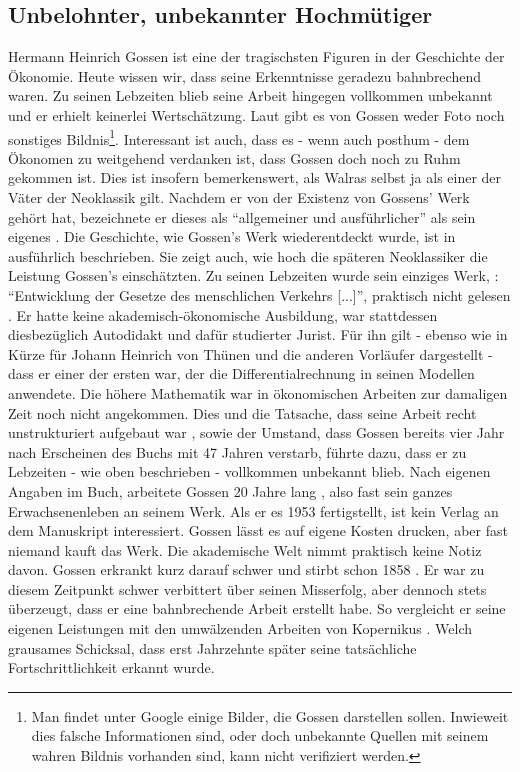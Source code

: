 \subsection{Unbelohnter, unbekannter Hochmütiger}

Hermann Heinrich Gossen ist eine der tragischsten Figuren in der Geschichte der Ökonomie. Heute wissen wir, dass seine Erkenntnisse geradezu bahnbrechend waren. Zu seinen Lebzeiten blieb seine Arbeit hingegen vollkommen unbekannt und er erhielt keinerlei Wertschätzung. Laut \textcite{Kurz2009} gibt es von Gossen weder Foto noch sonstiges Bildnis\footnote{Man findet unter Google einige Bilder, die Gossen darstellen sollen. Inwieweit dies falsche Informationen sind, oder doch unbekannte Quellen mit seinem wahren Bildnis vorhanden sind, kann nicht verifiziert werden.}. Interessant ist auch, dass es - wenn auch posthum - dem Ökonomen \textcite{Walras1885} zu weitgehend verdanken ist, dass Gossen doch noch zu Ruhm gekommen ist. Dies ist insofern bemerkenswert, als Walras selbst ja als einer der Väter der Neoklassik gilt. Nachdem er von der Existenz von Gossens' Werk gehört hat, bezeichnete er dieses als "`allgemeiner und ausführlicher"' als sein eigenes \parencite[S. 1]{Kurz2009}. Die Geschichte, wie Gossen's Werk wiederentdeckt wurde, ist in \textcite{Ikeda2000} ausführlich beschrieben. Sie zeigt auch, wie hoch die späteren Neoklassiker die Leistung Gossen's einschätzten.
Zu seinen Lebzeiten wurde sein einziges Werk, \textcite{Gossen1854}: "`Entwicklung der Gesetze des menschlichen Verkehrs [...]"', praktisch nicht gelesen \parencite[S. 282]{Rosner2012}. Er hatte keine akademisch-ökonomische Ausbildung, war stattdessen diesbezüglich Autodidakt \parencite[S. 3]{Kurz2009} und dafür studierter Jurist. Für ihn gilt - ebenso wie in Kürze für Johann Heinrich von Thünen und die anderen Vorläufer dargestellt - dass er einer der ersten war, der die Differentialrechnung in seinen Modellen anwendete. Die höhere Mathematik war in ökonomischen Arbeiten zur damaligen Zeit noch nicht angekommen. Dies und die Tatsache, dass seine Arbeit \parencite{Gossen1854} recht unstrukturiert aufgebaut war \parencite[S. 20]{Kurz2009}, sowie der Umstand, dass Gossen bereits vier Jahr nach Erscheinen des Buchs mit 47 Jahren verstarb, führte dazu, dass er zu Lebzeiten - wie oben beschrieben - vollkommen unbekannt blieb. Nach eigenen Angaben im Buch, arbeitete Gossen 20 Jahre lang \parencite[S. 3]{Kurz2009}, also fast sein ganzes Erwachsenenleben an seinem Werk. Als er es 1953 fertigstellt, ist kein Verlag an dem Manuskript interessiert. Gossen lässt es auf eigene Kosten drucken, aber fast niemand kauft das Werk. Die akademische Welt nimmt praktisch keine Notiz davon. Gossen erkrankt kurz darauf schwer und stirbt schon 1858 \parencite[S.4]{Kurz2009}. Er war zu diesem Zeitpunkt schwer verbittert über seinen Misserfolg, aber dennoch stets überzeugt, dass er eine bahnbrechende Arbeit erstellt habe. So vergleicht er seine eigenen Leistungen mit den umwälzenden Arbeiten von Kopernikus \parencite{Kurz2009, Gossen1854}. Welch grausames Schicksal, dass erst Jahrzehnte später seine tatsächliche Fortschrittlichkeit erkannt wurde.

